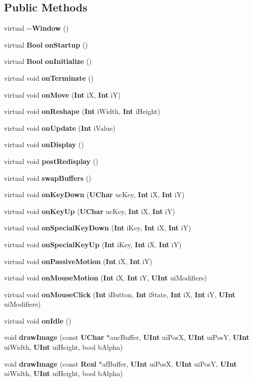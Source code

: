 \subsection*{Public Methods}
\begin{CompactItemize}
\item 
virtual {\bf $\sim$Window} ()
\item 
virtual {\bf Bool} {\bf on\-Startup} ()
\item 
virtual {\bf Bool} {\bf on\-Initialize} ()
\item 
virtual void {\bf on\-Terminate} ()
\item 
virtual void {\bf on\-Move} ({\bf Int} i\-X, {\bf Int} i\-Y)
\item 
virtual void {\bf on\-Reshape} ({\bf Int} i\-Width, {\bf Int} i\-Height)
\item 
virtual void {\bf on\-Update} ({\bf Int} i\-Value)
\item 
virtual void {\bf on\-Display} ()
\item 
virtual void {\bf post\-Redisplay} ()
\item 
virtual void {\bf swap\-Buffers} ()
\item 
virtual void {\bf on\-Key\-Down} ({\bf UChar} uc\-Key, {\bf Int} i\-X, {\bf Int} i\-Y)
\item 
virtual void {\bf on\-Key\-Up} ({\bf UChar} uc\-Key, {\bf Int} i\-X, {\bf Int} i\-Y)
\item 
virtual void {\bf on\-Special\-Key\-Down} ({\bf Int} i\-Key, {\bf Int} i\-X, {\bf Int} i\-Y)
\item 
virtual void {\bf on\-Special\-Key\-Up} ({\bf Int} i\-Key, {\bf Int} i\-X, {\bf Int} i\-Y)
\item 
virtual void {\bf on\-Passive\-Motion} ({\bf Int} i\-X, {\bf Int} i\-Y)
\item 
virtual void {\bf on\-Mouse\-Motion} ({\bf Int} i\-X, {\bf Int} i\-Y, {\bf UInt} ui\-Modifiers)
\item 
virtual void {\bf on\-Mouse\-Click} ({\bf Int} i\-Button, {\bf Int} i\-State, {\bf Int} i\-X, {\bf Int} i\-Y, {\bf UInt} ui\-Modifiers)
\item 
virtual void {\bf on\-Idle} ()
\item 
void {\bf draw\-Image} (const {\bf UChar} $\ast$auc\-Buffer, {\bf UInt} ui\-Pos\-X, {\bf UInt} ui\-Pos\-Y, {\bf UInt} ui\-Width, {\bf UInt} ui\-Height, bool b\-Alpha)
\item 
void {\bf draw\-Image} (const {\bf Real} $\ast$af\-Buffer, {\bf UInt} ui\-Pos\-X, {\bf UInt} ui\-Pos\-Y, {\bf UInt} ui\-Width, {\bf UInt} ui\-Height, bool b\-Alpha)

\end{CompactItemize}
